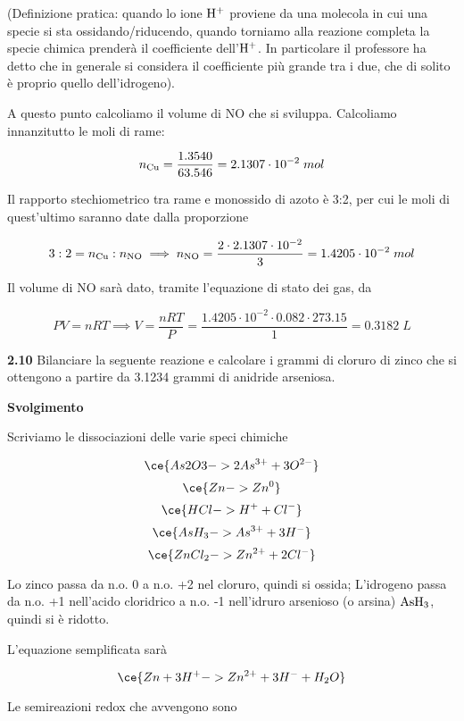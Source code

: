 (Definizione pratica: quando lo ione $\rm H^+$ proviene da una molecola in cui una specie si sta ossidando/riducendo, quando torniamo alla reazione completa la specie chimica prenderà il coefficiente dell'$\rm H^+$. In particolare il professore ha detto che in generale si considera il coefficiente più grande tra i due, che di solito è proprio quello dell'idrogeno).

\vspace{0.2cm}A questo punto calcoliamo il volume di NO che si sviluppa. Calcoliamo innanzitutto le moli di rame:

$$n_{\rm Cu}=\frac{1.3540}{63.546}=2.1307 \cdot 10^{-2}\;mol$$

Il rapporto stechiometrico tra rame e monossido di azoto è 3:2, per cui le moli di quest'ultimo saranno date dalla proporzione

$$3:2=n_{\rm Cu}:n_{\rm NO}
\implies
n_{\rm NO}=\frac{2 \cdot 2.1307 \cdot 10^{-2}}{3}=1.4205 \cdot 10^{-2}\;mol$$

Il volume di NO sarà dato, tramite l'equazione di stato dei gas, da

$$PV=nRT
\implies
V=\frac{nRT}{P}=\frac{1.4205 \cdot 10^{-2} \cdot 0.082 \cdot 273.15}{1}=0.3182\;L$$

\vspace{0.2cm}\textbf{2.10} Bilanciare la seguente reazione e calcolare i grammi di cloruro di zinco che si ottengono a partire da 3.1234 grammi di anidride arseniosa.

\begin{center}
\end{center}

\large\textbf{Svolgimento}\normalsize

\vspace{0.2cm}Scriviamo le dissociazioni delle varie speci chimiche

$$\ce{As2O3 -> 2As^{3+} + 3O^{2-}}$$
$$\ce{Zn -> Zn^0}$$
$$\ce{HCl -> H^+ + Cl^-}$$
$$\ce{AsH_3 -> As^{3+} + 3H^{-}}$$
$$\ce{ZnCl_2 -> Zn^{2+} + 2Cl^{-}}$$

Lo zinco passa da n.o. 0 a n.o. +2 nel cloruro, quindi si ossida; L'idrogeno passa da n.o. +1 nell'acido cloridrico a n.o. -1 nell'idruro arsenioso (o arsina) $\rm AsH_3$, quindi si è ridotto.

L'equazione semplificata sarà

$$\ce{Zn + 3H^+ -> Zn^{2+} + 3H^- + H_2O }$$

Le semireazioni redox che avvengono sono

